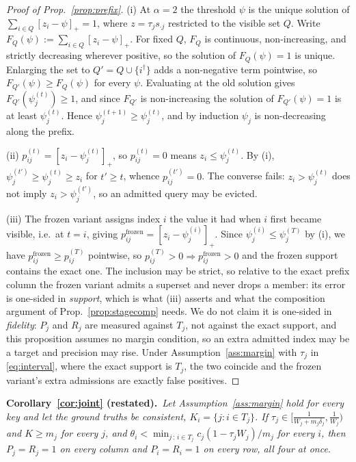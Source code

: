 \documentclass{article}
\begin{document}
\begin{proof}[Proof of Prop.~\ref{prop:prefix}]
(i) At $\alpha = 2$ the threshold $\psi$ is the unique solution of
$\sum_{i \in Q}[z_i - \psi]_+ = 1$, where $z = \tau_j s_{\cdot j}$ restricted to the visible set
$Q$. Write $F_Q(\psi) := \sum_{i\in Q}[z_i - \psi]_+$. For fixed $Q$, $F_Q$ is continuous,
non-increasing, and strictly decreasing wherever positive, so the solution of $F_Q(\psi)=1$ is
unique. Enlarging the set to $Q' = Q \cup \{i^\dagger\}$ adds a non-negative term pointwise, so
$F_{Q'}(\psi) \geq F_Q(\psi)$ for every $\psi$. Evaluating at the old solution gives
$F_{Q'}(\psi_j^{(t)}) \geq 1$, and since $F_{Q'}$ is non-increasing the solution of
$F_{Q'}(\psi) = 1$ is at least $\psi_j^{(t)}$. Hence $\psi_j^{(t+1)} \geq \psi_j^{(t)}$, and by
induction $\psi_j$ is non-decreasing along the prefix.

(ii) $p_{ij}^{(t)} = [z_i - \psi_j^{(t)}]_+$, so $p_{ij}^{(t)} = 0$ means
$z_i \leq \psi_j^{(t)}$. By (i), $\psi_j^{(t')} \geq \psi_j^{(t)} \geq z_i$ for $t' \geq t$,
whence $p_{ij}^{(t')} = 0$. The converse fails: $z_i > \psi_j^{(t)}$ does not imply
$z_i > \psi_j^{(t')}$, so an admitted query may be evicted.

(iii) The frozen variant assigns index $i$ the value it had when $i$ first became visible, i.e.\
at $t = i$, giving $p_{ij}^{\mathrm{frozen}} = [z_i - \psi_j^{(i)}]_+$. Since
$\psi_j^{(i)} \leq \psi_j^{(T)}$ by (i), we have
$p_{ij}^{\mathrm{frozen}} \geq p_{ij}^{(T)}$ pointwise, so
$p_{ij}^{(T)} > 0 \Rightarrow p_{ij}^{\mathrm{frozen}} > 0$ and the frozen support contains the
exact one. The inclusion may be strict, so relative to the exact prefix column the frozen variant
admits a superset and never drops a member: its error is one-sided in \emph{support}, which is
what (iii) asserts and what the composition argument of Prop.~\ref{prop:stagecomp} needs. We do
not claim it is one-sided in \emph{fidelity}: $P_j$ and $R_j$ are measured against $T_j$, not
against the exact support, and this proposition assumes no margin condition, so an extra
admitted index may be a target and precision may rise. Under Assumption~\ref{ass:margin} with
$\tau_j$ in \eqref{eq:interval}, where the exact support is $T_j$, the two coincide and the
frozen variant's extra admissions are exactly false positives.
\end{proof}

\medskip\noindent\textbf{Corollary~\ref{cor:joint} (restated).}\ \emph{Let Assumption~\ref{ass:margin} hold for every key and let the ground truths be consistent,
$K_i=\{j: i\in T_j\}$. If $\tau_j\in[\frac{1}{W_j+m_j\delta_j},\frac{1}{W_j})$ and $K \ge m_j$
for every $j$, and $\theta_i < \min_{j\,:\,i\in T_j} c_j(1-\tau_jW_j)/m_j$ for every $i$, then
$P_j=R_j=1$ on every column and $P_i=R_i=1$ on every row, all four at once.}
\end{document}
